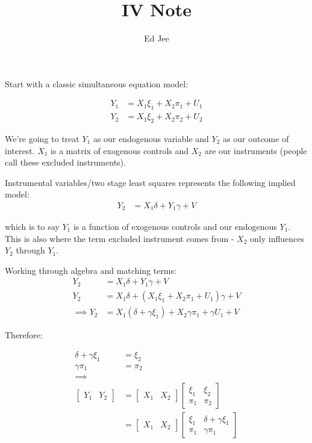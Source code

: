 \documentclass{article}
\title{IV Note}
\author{Ed Jee}
\begin{document}
\maketitle
   


Start with a classic simultaneous equation model:

\begin{align*}
    Y_1 &= X_1 \xi_1 + X_2 \pi_1 + U_1 \\
    Y_2 &= X_1 \xi_2 + X_2 \pi_2 + U_2
\end{align*}

We're going to treat $Y_1$ as our endogenous variable and $Y_2$ as our outcome 
of interest. $X_1$ is a matrix of exogenous controls and $X_2$ are our instruments 
(people call these excluded instruments).

Instrumental variables/two stage least squares represents the following implied model:
\begin{align*}
    Y_2 &= X_1 \delta + Y_1 \gamma + V
\end{align*}


which is to say $Y_1$ is a function of exogenous controls and our endogenous $Y_1$. 
This is also where the term excluded instrument comes from - $X_2$ only influences 
$Y_2$ through $Y_1$.


Working through algebra and matching terms:
\begin{align*}
    Y_2 &= X_1 \delta + Y_1 \gamma + V \\
    Y_2 &= X_1 \delta + (X_1 \xi_1 + X_2 \pi_1 + U_1) \gamma + V \\
    \implies Y_2 &= X_1 (\delta + \gamma \xi_1) + X_2 \gamma \pi_1 + \gamma U_1 + V
\end{align*}

Therefore:

\begin{align*}
    \delta + \gamma \xi_1 &= \xi_2 \\
    \gamma \pi_1 &= \pi_2  \\
    \implies \\
    \begin{bmatrix}
        Y_1 & Y_2
    \end{bmatrix} &= \begin{bmatrix}
        X_1 & X_2
    \end{bmatrix}
    \begin{bmatrix}
        \xi_1 & \xi_2 \\
        \pi_1 & \pi_2
    \end{bmatrix}  \\
     &= \begin{bmatrix}
        X_1 & X_2
    \end{bmatrix}
    \begin{bmatrix}
        \xi_1 &  \delta + \gamma \xi_1 \\
        \pi_1 & \gamma \pi_1
    \end{bmatrix} 
\end{align*}
\end{document}
